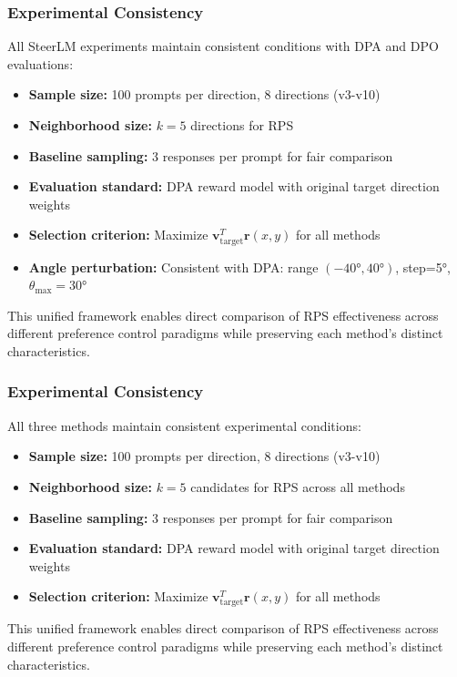 \documentclass{article} %
\begin{document}
\subsubsection{Experimental Consistency}

All SteerLM experiments maintain consistent conditions with DPA and DPO evaluations:
\begin{itemize}
    \item \textbf{Sample size:} 100 prompts per direction, 8 directions (v3-v10)
    \item \textbf{Neighborhood size:} $k=5$ directions for RPS
    \item \textbf{Baseline sampling:} 3 responses per prompt for fair comparison
    \item \textbf{Evaluation standard:} DPA reward model with original target direction weights
    \item \textbf{Selection criterion:} Maximize $\mathbf{v}_{\text{target}}^T \mathbf{r}(x,y)$ for all methods
    \item \textbf{Angle perturbation:} Consistent with DPA: range $(-40°, 40°)$, step=5°, $\theta_{\max}=30°$
\end{itemize}

This unified framework enables direct comparison of RPS effectiveness across different preference control paradigms while preserving each method's distinct characteristics.

\subsubsection{Experimental Consistency}

All three methods maintain consistent experimental conditions:
\begin{itemize}
    \item \textbf{Sample size:} 100 prompts per direction, 8 directions (v3-v10)
    \item \textbf{Neighborhood size:} $k=5$ candidates for RPS across all methods
    \item \textbf{Baseline sampling:} 3 responses per prompt for fair comparison
    \item \textbf{Evaluation standard:} DPA reward model with original target direction weights
    \item \textbf{Selection criterion:} Maximize $\mathbf{v}_{\text{target}}^T \mathbf{r}(x,y)$ for all methods
\end{itemize}

This unified framework enables direct comparison of RPS effectiveness across different preference control paradigms while preserving each method's distinct characteristics.
\end{document}
